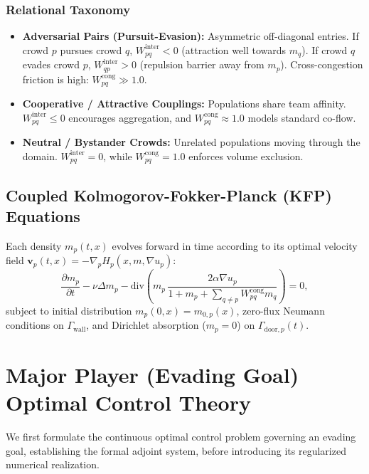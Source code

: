 \documentclass[11pt,a4paper]{article}
\begin{document}
\subsubsection{Relational Taxonomy}
\begin{itemize}
    \item \textbf{Adversarial Pairs (Pursuit-Evasion):} Asymmetric off-diagonal entries. If crowd $p$ pursues crowd $q$, $W_{pq}^{\text{inter}} < 0$ (attraction well towards $m_q$). If crowd $q$ evades crowd $p$, $W_{qp}^{\text{inter}} > 0$ (repulsion barrier away from $m_p$). Cross-congestion friction is high: $W_{pq}^{\text{cong}} \gg 1.0$.
    \item \textbf{Cooperative / Attractive Couplings:} Populations share team affinity. $W_{pq}^{\text{inter}} \le 0$ encourages aggregation, and $W_{pq}^{\text{cong}} \approx 1.0$ models standard co-flow.
    \item \textbf{Neutral / Bystander Crowds:} Unrelated populations moving through the domain. $W_{pq}^{\text{inter}} = 0$, while $W_{pq}^{\text{cong}} = 1.0$ enforces volume exclusion.
\end{itemize}

\subsection{Coupled Kolmogorov-Fokker-Planck (KFP) Equations}
Each density $m_p(t, x)$ evolves forward in time according to its optimal velocity field $\mathbf{v}_p(t, x) = -\nabla_p H_p(x, m, \nabla u_p)$:
\begin{equation}
\label{eq:kfp_npop}
\frac{\partial m_p}{\partial t} - \nu \Delta m_p - \text{div}\left( m_p \, \frac{2 \alpha \nabla u_p}{1 + m_p + \sum_{q \neq p} W_{pq}^{\text{cong}} m_q} \right) = 0,
\end{equation}
subject to initial distribution $m_p(0, x) = m_{0, p}(x)$, zero-flux Neumann conditions on $\Gamma_{\text{wall}}$, and Dirichlet absorption ($m_p = 0$) on $\Gamma_{\text{door}, p}(t)$.

\section{Major Player (Evading Goal) Optimal Control Theory}

We first formulate the continuous optimal control problem governing an evading goal, establishing the formal adjoint system, before introducing its regularized numerical realization.
\end{document}
